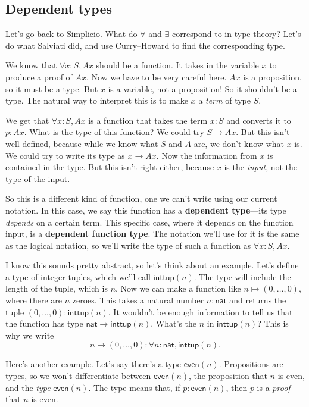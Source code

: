 \documentclass[11pt,paper=letter]{scrartcl}
\renewcommand{\sf}{\mathsf}
\begin{document}
\subsection{Dependent types}

Let's go back to Simplicio. What do $\forall$ and $\exists$ correspond to in type theory? Let's do what Salviati did, and use Curry--Howard to find the corresponding type.

We know that $\forall x:S, Ax$ should be a function. It takes in the variable $x$ to produce a proof of $Ax$. Now we have to be very careful here. $Ax$ is a proposition, so it must be a type. But $x$ is a variable, not a proposition! So it shouldn't be a type. The natural way to interpret this is to make $x$ a \emph{term} of type $S$.

We get that $\forall x: S, Ax$ is a function that takes the term $x : S$ and converts it to $p : Ax$. What is the type of this function? We could try $S \to Ax$. But this isn't well-defined, because while we know what $S$ and $A$ are, we don't know what $x$ is. We could try to write its type as $x \to Ax$. Now the information from $x$ is contained in the type. But this isn't right either, because $x$ is the \emph{input}, not the type of the input.

So this is a different kind of function, one we can't write using our current notation. In this case, we say this function has a \textbf{dependent type}---its type \emph{depends} on a certain term. This specific case, where it depends on the function input, is a \textbf{dependent function type}. The notation we'll use for it is the same as the logical notation, so we'll write the type of such a function as $\forall x: S, Ax$.

I know this sounds pretty abstract, so let's think about an example. Let's define a type of integer tuples, which we'll call $\sf{inttup}(n)$. The type will include the length of the tuple, which is $n$. Now we can make a function like $n \mapsto (0, \ldots, 0)$, where there are $n$ zeroes. This takes a natural number $n : \sf{nat}$ and returns the tuple $(0, \ldots, 0) : \sf{inttup}(n)$. It wouldn't be enough information to tell us that the function has type $\sf{nat} \to \sf{inttup}(n)$. What's the $n$ in $\sf{inttup}(n)$? This is why we write \[
  n \mapsto (0, \ldots, 0) : \forall n: \sf{nat}, \sf{inttup}(n).
\]

Here's another example. Let's say there's a type $\sf{even}(n)$. Propositions are types, so we won't differentiate between $\sf{even}(n)$, the proposition that $n$ is even, and the \emph{type} $\sf{even}(n)$. The type means that, if $p : \sf{even}(n)$, then $p$ is a \emph{proof} that $n$ is even.
\end{document}
